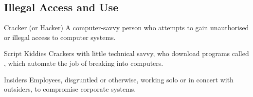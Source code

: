 \documentclass[\main/notes.tex]{subfiles}
\begin{document}
			\subsection{Illegal Access and Use}
				\begin{definition}{Cracker (or Hacker)}
					A computer-savvy person who attempts to gain unauthorised or illegal access to computer systems.
				\end{definition}
				\begin{definition}{Script Kiddies}
					Crackers with little technical savvy, who download programs called , which automate the job of breaking into computers.
				\end{definition}
				\begin{definition}{Insiders}
					Employees, disgruntled or otherwise, working solo or in concert with outsiders, to compromise corporate systems.
				\end{definition}
\end{document}
